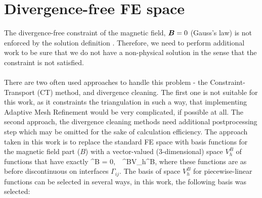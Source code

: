 \section{Divergence-free FE space}
\label{sec:divFreeSpace}
The divergence-free constraint of the magnetic field, $\mbox{\boldmath $B$} = 0$ (Gauss's law) is not enforced by the solution definition . Therefore, we need to perform additional work to be sure that we do not have a non-physical solution in the sense that the constraint is not satisfied.
\paragraph{}
There are two often used approaches to handle this problem - the Constraint-Transport (CT) method, and divergence cleaning. The first one is not suitable for this work, as it constraints the triangulation in such a way, that implementing Adaptive Mesh Refinement would be very complicated, if possible at all. The second approach, the divergence cleaning methods need additional postprocessing step which may be omitted for the sake of calculation efficiency. The approach taken in this work is to replace the standard FE space   with basis functions  for the magnetic field part ($B$) with a vector-valued (3-dimensional) space $V_h^B$ of functions that have exactly
\be
\nabla \cdot \mrvh^B = 0,\ \ \mrvh^B\in V_h^B,
\ee
where these functions are as before discontinuous on interfaces $\Gamma_{ij}$.
The basis of space $V_h^B$ for piecewise-linear functions can be selected in several ways, in this work, the following basis was selected:

